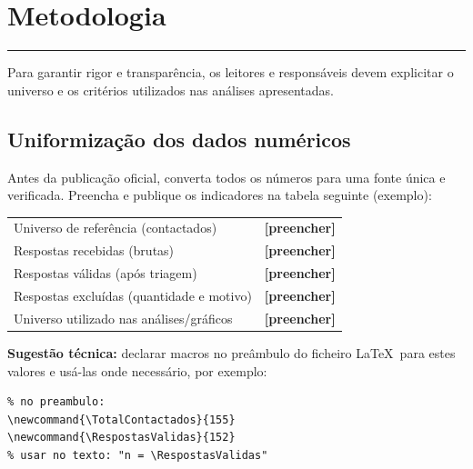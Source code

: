 \documentclass[12pt,a4paper]{article}
\begin{document}
\section*{Metodologia}
\textcolor{spe-secondary}{\rule{\linewidth}{0.5pt}}

\noindent Para garantir rigor e transparência, os leitores e responsáveis devem explicitar o universo e os critérios utilizados nas análises apresentadas.

\subsection*{Uniformização dos dados numéricos}
\noindent Antes da publicação oficial, converta todos os números para uma fonte única e verificada. Preencha e publique os indicadores na tabela seguinte (exemplo):
\begin{center}
\begin{tabular}{p{8.2cm} l}
\toprule
Universo de referência (contactados) & \textbf{[preencher]} \\
Respostas recebidas (brutas) & \textbf{[preencher]} \\
Respostas válidas (após triagem) & \textbf{[preencher]} \\
Respostas excluídas (quantidade e motivo) & \textbf{[preencher]} \\
Universo utilizado nas análises/gráficos & \textbf{[preencher]} \\
\bottomrule
\end{tabular}
\end{center}

\smallskip
\noindent \textbf{Sugestão técnica:} declarar macros no preâmbulo do ficheiro \LaTeX\ para estes valores e usá-las onde necessário, por exemplo:
\begin{verbatim}
% no preambulo:
\newcommand{\TotalContactados}{155}
\newcommand{\RespostasValidas}{152}
% usar no texto: "n = \RespostasValidas"
\end{verbatim}
\end{document}
